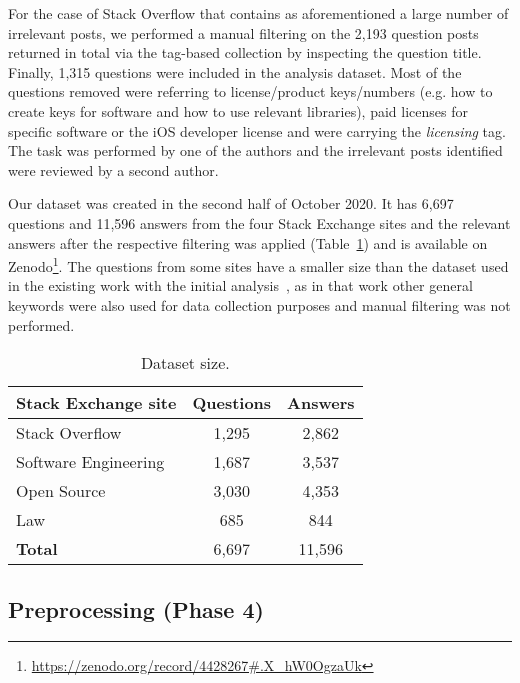 \documentclass{elsarticle}
\begin{document}
For the case of Stack Overflow that contains as aforementioned a large number of irrelevant posts, we performed a manual filtering on the 2,193 question posts returned in total via the tag-based collection by inspecting the question title. Finally, 1,315 questions were included in the analysis dataset. Most of the questions removed were referring to license/product keys/numbers (e.g. how to create keys for software and how to use relevant libraries), paid licenses for specific software or the iOS developer license and were carrying the \emph{licensing} tag. The task was performed by one of the authors and the irrelevant posts identified were reviewed by a second author.

Our dataset was created in the second half of October 2020. It has 6,697 questions and 11,596 answers from the four Stack Exchange sites and the relevant answers after the respective filtering was applied (Table~\ref{tab:dataset-size}) and is available on Zenodo\footnote{\url{https://zenodo.org/record/4428267#.X_hW0OgzaUk}}. The questions from some sites have a smaller size than the dataset used in the existing work with the initial analysis~\cite{kapitsaki2020developers}, as in that work other general keywords were also used for data collection purposes and manual filtering was not performed.

\begin{table}
\centering
  \caption{Dataset size.}
  \label{tab:dataset-size}
\begin{adjustbox}{width=0.5\textwidth}
  \begin{tabular}{lcc}
    \hline
    \textbf{Stack Exchange site} & \textbf{Questions} & \textbf{Answers}\\
    \hline
    Stack Overflow & 1,295 & 2,862\\ 
    Software Engineering & 1,687 & 3,537\\ 
    Open Source & 3,030 & 4,353\\ 
    Law & 685 & 844\\ 
    \hline
    \textbf{Total} & 6,697 & 11,596\\ 
    \hline
\end{tabular}
\end{adjustbox}
\end{table}

\subsection{Preprocessing (Phase 4)}
\end{document}
